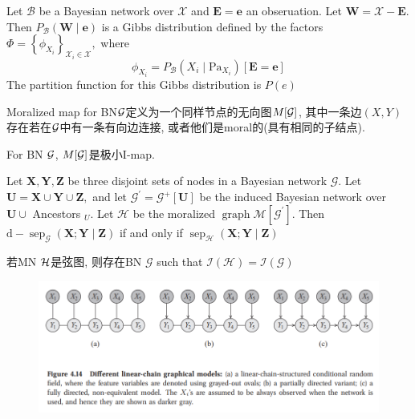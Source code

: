 \documentclass{article}
\begin{document}
\begin{flushleft}
    \begin{proposition}
        Let $\mathcal{B}$ be a Bayesian network over $\mathcal{X}$ and $\boldsymbol{E}=\boldsymbol{e}$ an obseruation. Let $\boldsymbol{W}=\mathcal{X}-\boldsymbol{E}$. Then $P_{\mathcal{B}}(\boldsymbol{W} \mid \boldsymbol{e})$ is a Gibbs distribution defined by the factors $\Phi=\left\{\phi_{X_{i}}\right\}_{\mathcal{X}_{i} \in \mathcal{X}},$ where
        $$
        \phi_{X_{i}}=P_{\mathcal{B}}\left(X_{i} \mid \mathrm{Pa}_{X_{i}}\right)[\boldsymbol{E}=\boldsymbol{e}]
        $$
        The partition function for this Gibbs distribution is $P(e)$
    \end{proposition}

    \begin{definition}
        Moralized map for BN$\cal G$定义为一个同样节点的无向图$M[\cal G]$, 其中一条边$(X,Y)$存在若在$\cal G$中有一条有向边连接, 或者他们是moral的(具有相同的子结点).
    \end{definition}

    \begin{proposition}
        For BN $\cal G$, $M[\cal G]$是极小I-map.
    \end{proposition}

    \begin{proposition}
        Let $\boldsymbol{X}, \boldsymbol{Y}, \boldsymbol{Z}$ be three disjoint sets of nodes in a Bayesian network $\mathcal{G} .$ Let $\boldsymbol{U}=\boldsymbol{X} \cup \boldsymbol{Y} \cup \boldsymbol{Z},$ and
        let $\mathcal{G}^{\prime}=\mathcal{G}^{+}[\boldsymbol{U}]$ be the induced Bayesian network over $\boldsymbol{U} \cup$ Ancestors $_{U}$. Let $\mathcal{H}$ be the moralized $\operatorname{graph} \mathcal{M}\left[\mathcal{G}^{\prime}\right] .$ Then $\mathrm{d}-\operatorname{sep}_{\mathcal{G}}(\boldsymbol{X} ; \boldsymbol{Y} \mid \boldsymbol{Z})$ if and only if $\operatorname{sep}_{\mathcal{H}}(\boldsymbol{X} ; \boldsymbol{Y} \mid \boldsymbol{Z})$
    \end{proposition}

    \begin{theorem}
        若MN $\cal H$是弦图, 则存在BN $\mathcal{G}$ such that $\mathcal{I}(\mathcal{H})=\mathcal{I}(\mathcal{G})$
    \end{theorem}

    \begin{figure}[htb!]
        \includegraphics{pgm-1.PNG}
    \end{figure}


\end{flushleft}
\end{document}
